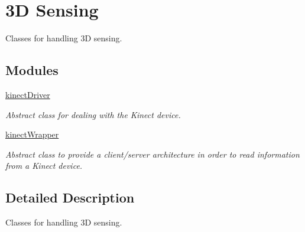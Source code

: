 \section{3D Sensing}
\label{group__depthSensing}


Classes for handling 3D sensing.  


\subsection*{Modules}
\begin{DoxyCompactItemize}
\item 
\hyperlink{group__kinectDriver}{kinect\+Driver}
\begin{DoxyCompactList}\small\item\em Abstract class for dealing with the Kinect device. \end{DoxyCompactList}\item 
\hyperlink{group__kinectWrapper}{kinect\+Wrapper}
\begin{DoxyCompactList}\small\item\em Abstract class to provide a client/server architecture in order to read information from a Kinect device. \end{DoxyCompactList}\end{DoxyCompactItemize}


\subsection{Detailed Description}
Classes for handling 3D sensing. 

